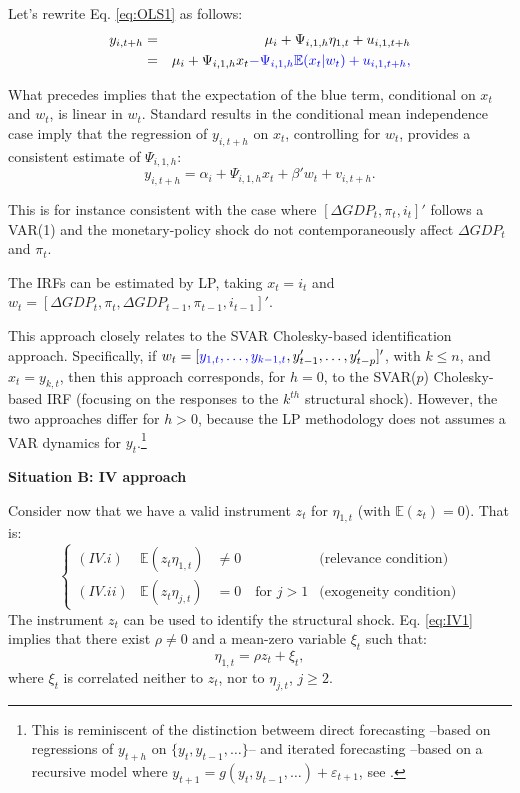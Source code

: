 \documentclass[
]{book}
\theoremstyle{definition}
\theoremstyle{definition}
\theoremstyle{definition}
\theoremstyle{definition}
\theoremstyle{remark}
\begin{document}
Let's rewrite Eq. \eqref{eq:OLS1} as follows:
\begin{eqnarray*}
y_{i,t+h} &=& \mu_i + \Psi_{i,1,h}\eta_{1,t} + u_{i,1,t+h}\\
&=&  \mu_i + \Psi_{i,1,h}x_t  \color{blue}{-\Psi_{i,1,h}\mathbb{E}(x_t|w_t) + u_{i,1,t+h}},
\end{eqnarray*}

What precedes implies that the expectation of the blue term, conditional on \(x_t\) and \(w_t\), is linear in \(w_t\). Standard results in the conditional mean independence case imply that the regression of \(y_{i,t+h}\) on \(x_t\), controlling for \(w_t\), provides a consistent estimate of \(\Psi_{i,1,h}\):
\begin{equation}
y_{i,t+h} = \alpha_i + \Psi_{i,1,h}x_t + \beta'w_t + v_{i,t+h}.
\end{equation}

This is for instance consistent with the case where \([\Delta GDP_t, \pi_t,i_t]'\) follows a VAR(1) and the monetary-policy shock do not contemporaneously affect \(\Delta GDP_t\) and \(\pi_t\).

The IRFs can be estimated by LP, taking \(x_t = i_t\) and \(w_t = [\Delta GDP_t,\pi_t,\Delta GDP_{t-1}, \pi_{t-1},i_{t-1}]'\).

This approach closely relates to the SVAR Cholesky-based identification approach. Specifically, if \(w_t = [{\color{blue}y_{1,t},\dots,y_{k-1,t}}, y_{t-1}',\dots,y_{t-p}']'\), with \(k\le n\), and \(x_t = y_{k,t}\), then this approach corresponds, for \(h=0\), to the SVAR(\(p\)) Cholesky-based IRF (focusing on the responses to the \(k^{th}\) structural shock). However, the two approaches differ for \(h>0\), because the LP methodology does not assumes a VAR dynamics for \(y_t\).\footnote{This is reminiscent of the distinction betweem direct forecasting --based on regressions of \(y_{t+h}\) on \(\{y_t,y_{t-1},\dots\}\)-- and iterated forecasting --based on a recursive model where \(y_{t+1} = g(y_t,y_{t-1},\dots)+\varepsilon_{t+1}\), see \citet{Marcellino_et_al_2006}.}

\textbf{Situation B: IV approach}

Consider now that we have a valid instrument \(z_t\) for \(\eta_{1,t}\) (with \(\mathbb{E}(z_t)=0\)). That is:
\begin{equation}
\left\{
\begin{array}{llll}
(IV.i) & \mathbb{E}(z_t \eta_{1,t}) &\ne 0 & \mbox{(relevance condition)} \\
(IV.ii) & \mathbb{E}(z_t \eta_{j,t}) &= 0 \quad \mbox{for } j>1 & \mbox{(exogeneity condition)}
\end{array}\right.\label{eq:IV1}
\end{equation}
The instrument \(z_t\) can be used to identify the structural shock. Eq. \eqref{eq:IV1} implies that there exist \(\rho \ne 0\) and a mean-zero variable \(\xi_t\) such that:
\[
\eta_{1,t} = \rho z_t + \xi_t,
\]
where \(\xi_t\) is correlated neither to \(z_t\), nor to \(\eta_{j,t}\), \(j\ge2\).
\end{document}
